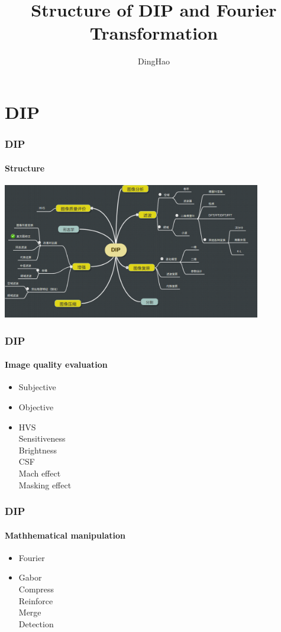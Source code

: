 \documentclass[11 pt,t]{beamer}
\author{DingHao}
\title{Structure of DIP and Fourier Transformation}
\begin{document}
\frame{\titlepage}


\section{DIP}


\begin{frame}
\frametitle{DIP}
\framesubtitle{Structure}
   \includegraphics[width=11.3cm]{DIP.png}
\end{frame}

\begin{frame}
\frametitle{DIP}
\framesubtitle{Image quality evaluation}
\begin{itemize}
    \item Subjective
    \item Objective\\
    \item HVS\\
        {\textcolor{tangocolordarkchameleon}{Sensitiveness\\Brightness\\CSF\\Mach effect\\Masking effect} }
\end{itemize}	
\end{frame}

\begin{frame}
\frametitle{DIP}
\framesubtitle{Mathhematical manipulation}
	\begin{itemize}
	\item Fourier
    	\item Gabor\\
{\textcolor{tangocolordarkchameleon}{Compress\\Reinforce\\Merge\\Detection} }
\end{itemize}
\end{frame}
\end{document}
